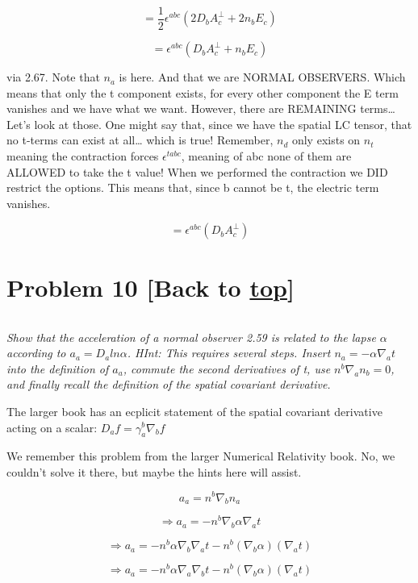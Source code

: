\documentclass[landscape,letterpaper,10pt,english]{article}
\begin{document}
\[ = \frac12 \epsilon^{abc} ( 2D_bA_c^\perp + 2n_bE_c ) \]

\[ = \epsilon^{abc} ( D_bA_c^\perp + n_bE_c ) \]

via 2.67. Note that \(n_a\) is here. And that we are NORMAL OBSERVERS.
Which means that only the t component exists, for every other component
the E term vanishes and we have what we want. However, there are
REMAINING terms\ldots{} Let's look at those. One might say that, since
we have the spatial LC tensor, that no t-terms can exist at all\ldots{}
which is true! Remember, \(n_d\) only exists on \(n_t\) meaning the
contraction forces \(\epsilon^{tabc}\), meaning of abc none of them are
ALLOWED to take the t value! When we performed the contraction we DID
restrict the options. This means that, since b cannot be t, the electric
term vanishes.

\[ = \epsilon^{abc} (D_bA_c^\perp ) \]

    \hypertarget{problem-10-back-to-top}{%
\section{\texorpdfstring{Problem 10 {[}Back to
\hyperref[toc]{top}{]}}{Problem 10 {[}Back to {]}}}\label{problem-10-back-to-top}}

\[\label{P10}\]

\emph{Show that the acceleration of a normal observer 2.59 is related to
the lapse \(\alpha\) according to \(a_a = D_a ln\alpha\). HInt: This
requires several steps. Insert \(n_a = -\alpha\nabla_a t\) into the
definition of \(a_a\), commute the second derivatives of t, use
\(n^b\nabla_an_b=0\), and finally recall the definition of the spatial
covariant derivative.}

    The larger book has an ecplicit statement of the spatial covariant
derivative acting on a scalar: \(D_a f = \gamma^b_a \nabla_b f\)

    We remember this problem from the larger Numerical Relativity book. No,
we couldn't solve it there, but maybe the hints here will assist.

\[ a_a = n^b \nabla_b n_a \]

\[ \Rightarrow a_a = - n^b \nabla_b \alpha \nabla_a t \]

\[ \Rightarrow a_a = - n^b \alpha \nabla_b \nabla_a t - n^b (\nabla_b \alpha) (\nabla_a t)   \]

\[ \Rightarrow a_a = - n^b \alpha \nabla_a \nabla_b t - n^b (\nabla_b \alpha) (\nabla_a t)   \]
\end{document}
